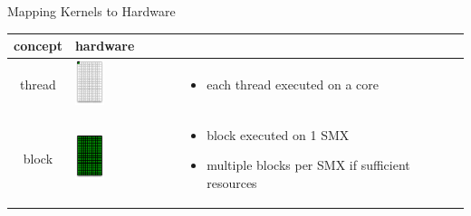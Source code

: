 \documentclass[aspectratio=43]{beamer}
\begin{document}
\begin{frame}[fragile]{Mapping Kernels to Hardware}
\begin{center}
\vspace{-0.75cm}
\begin{tabular}{|c|m{4cm}|m{5cm}|}
    \cline{1-2}
        concept & hardware &  \multicolumn{1}{c}{} \\
    \hline
        thread &
        \begin{minipage}{4cm}
            \includegraphics[width=0.3\textwidth]{./images/core.pdf}
        \end{minipage} &
        \footnotesize
        \begin{itemize}
            \item each thread executed on a core
        \end{itemize} \\
    \hline
        block &
        \begin{minipage}{4cm}
            \includegraphics[width=0.3\textwidth]{./images/smx.pdf}
        \end{minipage} &
        \footnotesize
        \begin{itemize}
            \item block executed on 1 SMX
            \item multiple blocks per SMX if sufficient resources

\end{itemize}
\end{tabular}
\end{center}
\end{frame}
\end{document}
